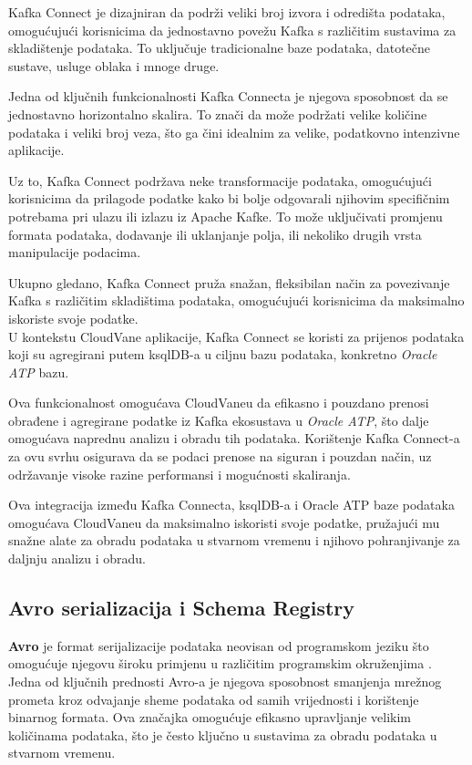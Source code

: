 \documentclass[times, utf8, diplomski]{fer}
\begin{document}
Kafka Connect je dizajniran da podrži veliki broj izvora  i odredišta  podataka, omogućujući korisnicima da jednostavno povežu Kafka s različitim sustavima za skladištenje podataka. To uključuje tradicionalne baze podataka, datotečne sustave, usluge oblaka i mnoge druge.

Jedna od ključnih funkcionalnosti Kafka Connecta je njegova sposobnost da se jednostavno horizontalno skalira. To znači da može podržati velike količine podataka i veliki broj veza, što ga čini idealnim za velike, podatkovno intenzivne aplikacije.

Uz to, Kafka Connect podržava neke transformacije podataka, omogućujući korisnicima da prilagode podatke kako bi bolje odgovarali njihovim specifičnim potrebama pri ulazu ili izlazu iz Apache Kafke. To može uključivati promjenu formata podataka, dodavanje ili uklanjanje polja, ili nekoliko drugih vrsta manipulacije podacima.

Ukupno gledano, Kafka Connect pruža snažan, fleksibilan način za povezivanje Kafka s različitim skladištima podataka, omogućujući korisnicima da maksimalno iskoriste svoje podatke. \\

U kontekstu CloudVane aplikacije, Kafka Connect se koristi za prijenos podataka koji su agregirani putem ksqlDB-a u ciljnu bazu podataka, konkretno \emph{Oracle ATP}  bazu.

Ova funkcionalnost omogućava CloudVaneu da efikasno i pouzdano prenosi obrađene i agregirane podatke iz Kafka ekosustava u \emph{Oracle ATP}, što dalje omogućava naprednu analizu i obradu tih podataka. Korištenje Kafka Connect-a za ovu svrhu osigurava da se podaci prenose na siguran i pouzdan način, uz održavanje visoke razine performansi i mogućnosti skaliranja.

Ova integracija između Kafka Connecta, ksqlDB-a i Oracle ATP baze podataka omogućava CloudVaneu da maksimalno iskoristi svoje podatke, pružajući mu snažne alate za obradu podataka u stvarnom vremenu i njihovo pohranjivanje za daljnju analizu i obradu.

\clearpage
\subsection{Avro serializacija i Schema Registry}
\label{sec:schema}

\textbf{Avro} je format serijalizacije podataka neovisan od programskom jeziku što omogućuje njegovu široku primjenu u različitim programskim okruženjima \citep{shapira_kafka_2021}. Jedna od ključnih prednosti Avro-a je njegova sposobnost smanjenja mrežnog prometa kroz odvajanje sheme podataka od samih vrijednosti i korištenje binarnog formata. Ova značajka omogućuje efikasno upravljanje velikim količinama podataka, što je često ključno u sustavima za obradu podataka u stvarnom vremenu.
\end{document}
